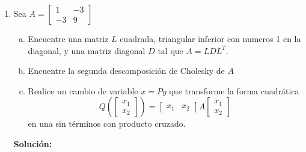 \documentclass[12pt]{article}
\newenvironment{solucion}
{\begin{mdframed}[backgroundcolor=black!10]
		{\bf Solución:}\\
	}
	{
	\end{mdframed}
}
\newenvironment{preguntas}
{\begin{enumerate}\itemsep12pt
	}
	{
	\end{enumerate}
}
\begin{document}
\begin{preguntas}
\item Sea $A = \begin{bmatrix}1 & -3 \\ -3 & 9\end{bmatrix}$
\begin{enumerate}[a)]
\item Encuentre una matriz $L$ cuadrada, triangular inferior con numeros 1 en la diagonal, y una matriz diagonal $D$ tal que $A = LDL^T$.
\item Encuentre la segunda descomposición de Cholesky de $A$
\item Realice un cambio de variable $x=Py$ que transforme la forma cuadrática
		$$Q\left(\begin{bmatrix}x_1\\x_2\end{bmatrix}\right) = \begin{bmatrix}x_1& x_2\end{bmatrix}A\begin{bmatrix}x_1\\ x_2\end{bmatrix}$$
		en una sin términos con producto cruzado.
\end{enumerate}
\begin{solucion}


\end{solucion}
\end{preguntas}
\end{document}
